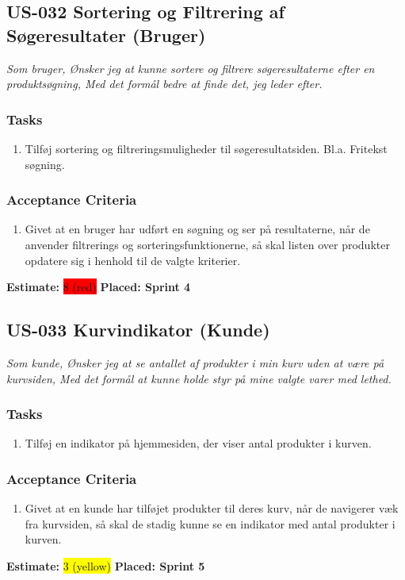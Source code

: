 \subsection{US-032 Sortering og Filtrering af Søgeresultater (Bruger)}
\label{sec:US-032}
\textit{Som bruger, Ønsker jeg at kunne sortere og filtrere søgeresultaterne efter en produktsøgning, Med det formål bedre at finde det, jeg leder efter.}
\subsubsection*{\textbf{Tasks}}
\begin{enumerate}
  \item Tilføj sortering og filtreringsmuligheder til søgeresultatsiden. Bl.a. Fritekst søgning.
\end{enumerate}
\subsubsection*{\textbf{Acceptance Criteria}}
\begin{enumerate}
  \item Givet at en bruger har udført en søgning og ser på resultaterne, når de anvender filtrerings og sorteringsfunktionerne, så skal listen over produkter opdatere sig i henhold til de valgte kriterier.
\end{enumerate}
\textbf{Estimate:} \colorbox{red}{8 (red)}
\textbf{Placed: Sprint 4}
\par\noindent\dotfill

\subsection{US-033 Kurvindikator (Kunde)}
\label{sec:US-033}
\textit{Som kunde, Ønsker jeg at se antallet af produkter i min kurv uden at være på kurvsiden, Med det formål at kunne holde styr på mine valgte varer med lethed.}
\subsubsection*{\textbf{Tasks}}
\begin{enumerate}
  \item Tilføj en indikator på hjemmesiden, der viser antal produkter i kurven.
\end{enumerate}
\subsubsection*{\textbf{Acceptance Criteria}}
\begin{enumerate}
  \item Givet at en kunde har tilføjet produkter til deres kurv, når de navigerer væk fra kurvsiden, så skal de stadig kunne se en indikator med antal produkter i kurven.
\end{enumerate}
\textbf{Estimate:} \colorbox{yellow}{3 (yellow)}
\textbf{Placed: Sprint 5}
\par\noindent\dotfill

